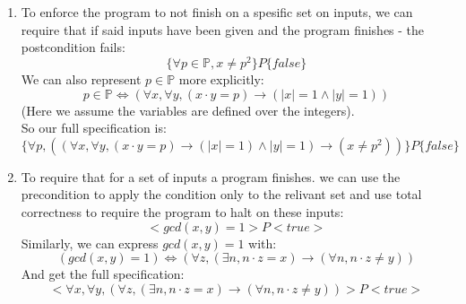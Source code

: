 \documentclass{article}
\begin{document}
\section{}
\begin{enumerate}[label=\Alph*.]
    \item To enforce the program to not finish
    on a spesific set on inputs, we can require that if
    said inputs have been given and the program finishes - 
    the postcondition fails:
    \[\{\forall p\in\mathbb{P}, x\neq p^2\}P\{false\}\]
    We can also represent $p\in\mathbb{P}$ more explicitly:
    \[p\in\mathbb{P}\Leftrightarrow
    (\forall x,\forall y, (x\cdot y=p)\rightarrow (|x|=1\wedge|y|=1))\]
    (Here we assume the variables are defined over the integers).\\
    So our full specification is:
    \[\{\forall p,
    ((\forall x,\forall y, (x\cdot y=p)\rightarrow (|x|=1)\wedge|y|=1)
    \rightarrow
    (x\neq p^2))\}P\{false\}\]
    \item To require that for a set of inputs a program finishes.
    we can use the precondition to apply the condition only to
    the relivant set and use total correctness to require the program to halt
    on these inputs:
    \[<gcd(x,y)=1>P<true>\]
    Similarly, we can express $gcd(x,y)=1$ with:
    \[
        (gcd(x,y)=1)
    \Leftrightarrow
        (\forall z,(\exists n, n\cdot z=x)\rightarrow (\forall n, n\cdot z\neq y))
    \]
    And get the full specification:
    \[<\forall x,\forall y,(\forall z,(\exists n, n\cdot z=x)\rightarrow (\forall n, n\cdot z\neq y))>P<true>\]
\end{enumerate}
\end{document}
